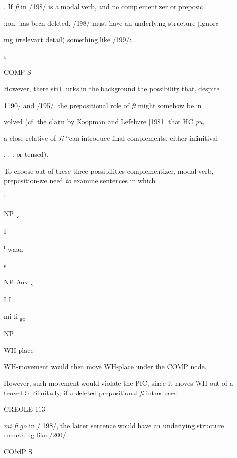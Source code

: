. If \textit{fi} in /198/ is a modal verb, and no complementizer or preposic

:ion. has been deleted, /198/ must have an underlying structure (ignore

mg irrelevant detail) something like /199/:

\ea\label{ex:199}

\glt
\z

s

COMP S

However, there still lurks in the background the possibility that, despite

1190/ and /195/, the prepositional role of \textit{ft} might somehow be in\-

volved (cf. the claim by Koopman and Lefebvre [1981] that HC \textit{pu,}

a close relative of \textit{Ji} ``can introduce final complements, either infinitival

. . . or tensed{\textquotedbl}).

To choose out of these three possibilities-complementizer, modal verb, preposition-we need \textit{to }examine sentences in which

'

NP \textsubscript{v}

I 

\textsuperscript{i }waan

s

NP Aux\textsubscript{ }\textsubscript{v}

I I 

mi fi \textsubscript{go}

NP

WH-place


WH-movement would then move WH-place under the COMP node.

However, such movement would violate the PIC, since it moves WH out of a tensed S. Similarly, if a deleted prepositional \textit{fi} introduced

\ea\label{ex:201}
 
\glt
\z

CREOLE 113

\textit{mi} \textit{fi} \textit{go} in / 198/, the latter sentence would have an underiying struc\-ture something like /200/:

\ea\label{ex:200}
 
\glt
\z

CO!vlP S


